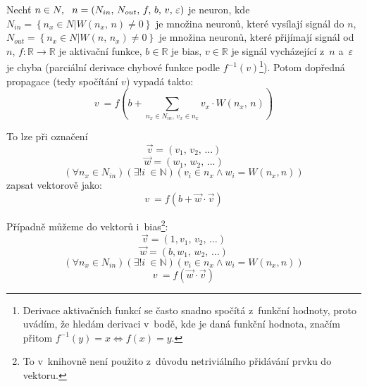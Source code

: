 \documentclass[12pt]{report}			%
\newcommand{\R}{\mathbb{R}}   			%
\newcommand{\N}{\mathbb{N}}   			%
\begin{document}
				Nechť $n \in N, \hspace{1.5ex} n = \left(N_{in},\,N_{out},\,f,\,b,\,v,\,\varepsilon\right)$ je neuron, kde $N_{in} = \left\{n_x \in N|W\left(n_x,\,n\right) \neq 0\right\}$ je množina neuronů, které vysílají signál do $n$, $N_{out} = \left\{n_x \in N|W\left(n,\,n_x\right) \neq 0\right\}$ je množina neuronů, které přijímají signál od $n$, $f\!: \R \rightarrow \R$ je aktivační funkce, $b \in \R$ je bias, $v \in \R$ je signál vycházející z~$n$ a~$\varepsilon$ je chyba (parciální derivace chybové funkce podle $f^{-1}(v)$\footnote{Derivace aktivačních funkcí se často snadno spočítá z~funkční hodnoty, proto uvádím, že hledám derivaci v~bodě, kde je daná funkční hodnota, značím přitom $f^{-1}(y) = x \Leftrightarrow f(x) = y$.}). Potom dopředná propagace (tedy spočítání $v$) vypadá takto:
				\begin{equation} v~= f\left(b + \sum_{n_x \in N_{in},\,v_x \in n_x} v_x \cdot W\left(n_x,\,n\right) \right) \end{equation}
				
				To lze při označení
				\begin{equation} \vec{v} = (v_{1},\,v_{2},\,\ldots) \end{equation}
				\begin{equation} \vec{w} = (w_{1},\,w_{2},\,\ldots) \end{equation}
				\begin{equation} \left(\forall n_x \in N_{in}\right)\left(\exists! i~\in \N\right)\left(v_i \in n_x \land w_i = W(n_x, n)\right) \end{equation}
				zapsat vektorově jako:
				\begin{equation} v~= f\left(b + \vec{w} \cdot \vec{v} \right) \end{equation}
				
				Případně můžeme do vektorů  i~bias\footnote{To v~knihovně není použito z~důvodu netriviálního přidávání prvku do vektoru.}:
				\begin{equation} \vec{v} = (1, v_{1},\,v_{2},\,\ldots) \end{equation}
				\begin{equation} \vec{w} = (b, w_{1},\,w_{2},\,\ldots) \end{equation}
				\begin{equation} \left(\forall n_x \in N_{in}\right)\left(\exists! i~\in \N\right)\left(v_i \in n_x \land w_i = W(n_x, n)\right) \end{equation}
				\begin{equation} v~= f\left(\vec{w} \cdot \vec{v} \right) \end{equation}
				
\end{document}
